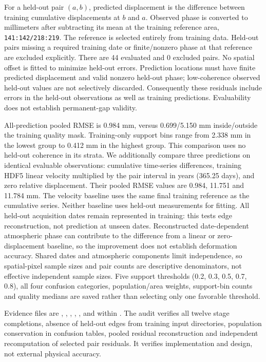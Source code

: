For a held-out pair $(a,b)$, predicted displacement is the difference between training cumulative displacements at $b$ and $a$. Observed phase is converted to millimeters after subtracting its mean at the training reference area, \texttt{141:142/218:219}. The reference is selected entirely from training data. Held-out pairs missing a required training date or finite/nonzero phase at that reference are excluded explicitly. There are 44 evaluated and 0 excluded pairs. No spatial offset is fitted to minimize held-out errors. Prediction locations must have finite predicted displacement and valid nonzero held-out phase; low-coherence observed held-out values are not selectively discarded. Consequently these residuals include errors in the held-out observations as well as training predictions. Evaluability does not establish permanent-gap validity.

All-prediction pooled RMSE is 0.984 mm, versus 0.699/5.150 mm inside/outside the training quality mask. Training-only support bins range from 2.338 mm in the lowest group to 0.412 mm in the highest group. This comparison uses no held-out coherence in its strata. We additionally compare three predictions on identical evaluable observations: cumulative time-series differences, training HDF5 linear velocity multiplied by the pair interval in years (365.25 days), and zero relative displacement. Their pooled RMSE values are 0.984, 11.751 and 11.784 mm. The velocity baseline uses the same final training reference as the cumulative series. Neither baseline uses held-out measurements for fitting. All held-out acquisition dates remain represented in training: this tests edge reconstruction, not prediction at unseen dates. Reconstructed date-dependent atmospheric phase can contribute to the difference from a linear or zero-displacement baseline, so the improvement does not establish deformation accuracy. Shared dates and atmospheric components limit independence, so spatial-pixel sample sizes and pair counts are descriptive denominators, not effective independent sample sizes. Five support thresholds (0.2, 0.3, 0.5, 0.7, 0.8), all four confusion categories, population/area weights, support-bin counts and quality medians are saved rather than selecting only one favorable threshold.

Evidence files are , , , , ,  and  within . The audit verifies all twelve stage completions, absence of held-out edges from training input directories, population conservation in confusion tables, pooled residual reconstruction and independent recomputation of selected pair residuals. It verifies implementation and design, not external physical accuracy.

